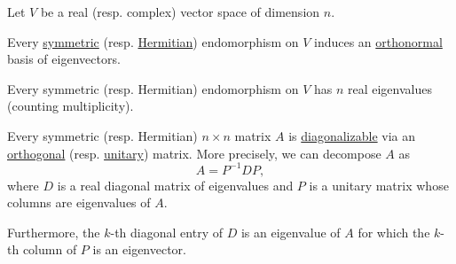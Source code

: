 \begin{theorem}\label{thm:finite_dimensional_spectral_theorem}
  Let \( V \) be a real (resp. complex) vector space of dimension \( n \).

  \begin{thmenum}
     Every \hyperref[def:transpose_matrix]{symmetric} (resp. \hyperref[def:conjugate_transpose]{Hermitian}) endomorphism on \( V \) induces an \hyperref[def:orthogonality]{orthonormal} basis of eigenvectors.

     Every symmetric (resp. Hermitian) endomorphism on \( V \) has \( n \) real eigenvalues (counting multiplicity).

     Every symmetric (resp. Hermitian) \( n \times n \) matrix \( A \) is \hyperref[def:diagonalizable_matrix]{diagonalizable} via an \hyperref[def:unitary_matrix]{orthogonal} (resp. \hyperref[def:unitary_matrix]{unitary}) matrix. More precisely, we can decompose \( A \) as
    \begin{equation*}
      A = P^{-1} D P,
    \end{equation*}
    where \( D \) is a real diagonal matrix of eigenvalues and \( P \) is a unitary matrix whose columns are eigenvalues of \( A \).

    Furthermore, the \( k \)-th diagonal entry of \( D \) is an eigenvalue of \( A \) for which the \( k \)-th column of \( P \) is an eigenvector.
  \end{thmenum}
\end{theorem}
